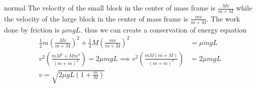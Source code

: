 \begin{solution}{normal}
The velocity of the small block in the center of mass frame is $\frac{Mv}{m+M}$ while the velocity of the large block in the center of mass frame is $\frac{mv}{m+M}$. The work done by friction is $\mu mgL$, thus we can create a conservation of energy equation
\begin{align*}
\frac{1}{2}m\left(\frac{Mv}{m+M}\right)^2 + \frac{1}{2}M\left(\frac{mv}{m+M}\right)^2 &= \mu mgL\\
v^2\left(\frac{mM^2 + Mm^2}{(m+m)^2}\right)=2\mu mgL\implies v^2\left(\frac{mM(m+M)}{(m+m)^2}\right)&=2\mu mgL\\
\boxed{v=\sqrt{2\mu gL\left(1+\frac{m}{M}\right)}}
\end{align*}
\end{solution}
